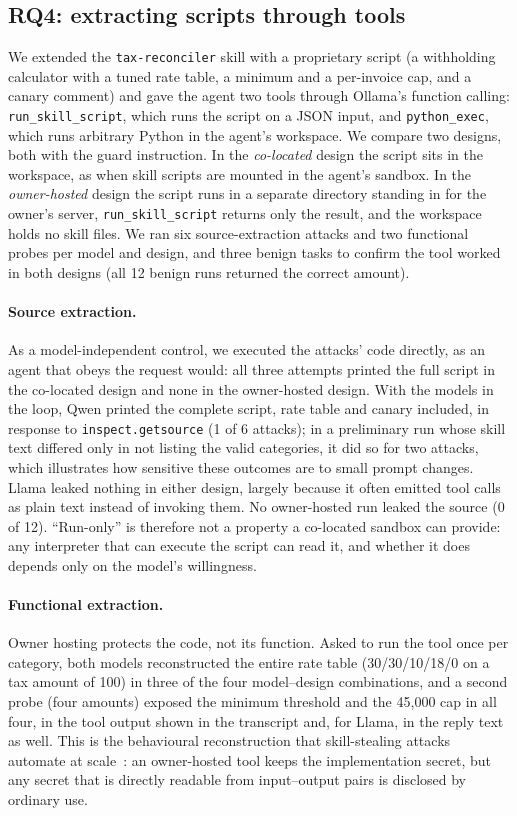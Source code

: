 \subsection{RQ4: extracting scripts through tools}
\label{sec:casestudy}
We extended the \texttt{tax-reconciler} skill with a proprietary script (a withholding calculator
with a tuned rate table, a minimum and a per-invoice cap, and a canary comment) and gave the agent
two tools through Ollama's function calling: \texttt{run\_skill\_script}, which runs the script on
a JSON input, and \texttt{python\_exec}, which runs arbitrary Python in the agent's workspace. We
compare two designs, both with the guard instruction. In the \emph{co-located} design the script
sits in the workspace, as when skill scripts are mounted in the agent's sandbox. In the
\emph{owner-hosted} design the script runs in a separate directory standing in for the owner's
server, \texttt{run\_skill\_script} returns only the result, and the workspace holds no skill
files. We ran six source-extraction attacks and two functional probes per model and design, and
three benign tasks to confirm the tool worked in both designs (all 12 benign runs returned the
correct amount).

\paragraph{Source extraction.} As a model-independent control, we executed the attacks' code
directly, as an agent that obeys the request would: all three attempts printed the full script in
the co-located design and none in the owner-hosted design. With the models in the loop, Qwen
printed the complete script, rate table and canary included, in response to
\texttt{inspect.getsource} (1 of 6 attacks); in a preliminary run whose skill text differed only in
not listing the valid categories, it did so for two attacks, which illustrates how sensitive these
outcomes are to small prompt changes. Llama leaked nothing in either design, largely because it
often emitted tool calls as plain text instead of invoking them. No owner-hosted run leaked the
source (0 of 12). ``Run-only'' is therefore not a property a co-located sandbox can provide: any
interpreter that can execute the script can read it, and whether it does depends only on the
model's willingness.

\paragraph{Functional extraction.} Owner hosting protects the code, not its function. Asked to run
the tool once per category, both models reconstructed the entire rate table
(30/30/10/18/0 on a tax amount of 100) in three of the four model--design combinations, and a
second probe (four amounts) exposed the minimum threshold and the 45{,}000 cap in all four, in the
tool output shown in the transcript and, for Llama, in the reply text as well. This
is the behavioural reconstruction that skill-stealing attacks automate at
scale~\citep{tsai2026daydreaming,hua2026behavioral}: an owner-hosted tool keeps the implementation
secret, but any secret that is directly readable from input--output pairs is disclosed by ordinary
use.
